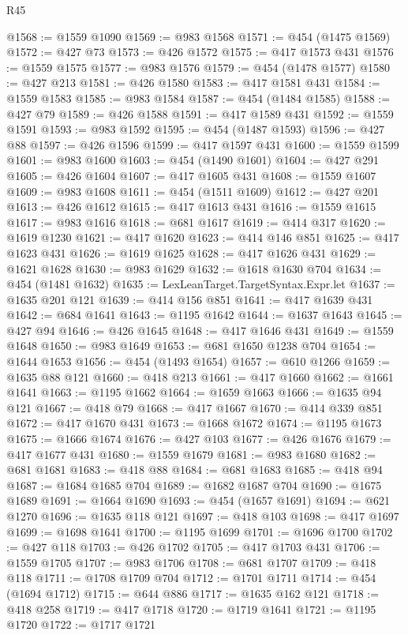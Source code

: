 \begin{lexlean}{R45}
\begin{coremodule}
{{{{{{{{{{{{{{{{{{{{{{{{{{{{{{{{{{{{{{{{{{{{{{{{{{{{{{{{{{{{{{{{{{{{{{{{{{{{{{{{{{{{{{{{{{{@1568 := @1559 @1090
@1569 := @983 @1568
@1571 := @454 (@1475 @1569)
@1572 := @427 @73
@1573 := @426 @1572
@1575 := @417 @1573 @431
@1576 := @1559 @1575
@1577 := @983 @1576
@1579 := @454 (@1478 @1577)
@1580 := @427 @213
@1581 := @426 @1580
@1583 := @417 @1581 @431
@1584 := @1559 @1583
@1585 := @983 @1584
@1587 := @454 (@1484 @1585)
@1588 := @427 @79
@1589 := @426 @1588
@1591 := @417 @1589 @431
@1592 := @1559 @1591
@1593 := @983 @1592
@1595 := @454 (@1487 @1593)
@1596 := @427 @88
@1597 := @426 @1596
@1599 := @417 @1597 @431
@1600 := @1559 @1599
@1601 := @983 @1600
@1603 := @454 (@1490 @1601)
@1604 := @427 @291
@1605 := @426 @1604
@1607 := @417 @1605 @431
@1608 := @1559 @1607
@1609 := @983 @1608
@1611 := @454 (@1511 @1609)
@1612 := @427 @201
@1613 := @426 @1612
@1615 := @417 @1613 @431
@1616 := @1559 @1615
@1617 := @983 @1616
@1618 := @681 @1617
@1619 := @414 @317
@1620 := @1619 @1230
@1621 := @417 @1620
@1623 := @414 @146 @851
@1625 := @417 @1623 @431
@1626 := @1619 @1625
@1628 := @417 @1626 @431
@1629 := @1621 @1628
@1630 := @983 @1629
@1632 := @1618 @1630 @704
@1634 := @454 (@1481 @1632)
@1635 := LexLeanTarget.TargetSyntax.Expr.let
@1637 := @1635 @201 @121
@1639 := @414 @156 @851
@1641 := @417 @1639 @431
@1642 := @684 @1641
@1643 := @1195 @1642
@1644 := @1637 @1643
@1645 := @427 @94
@1646 := @426 @1645
@1648 := @417 @1646 @431
@1649 := @1559 @1648
@1650 := @983 @1649
@1653 := @681 @1650 @1238 @704
@1654 := @1644 @1653
@1656 := @454 (@1493 @1654)
@1657 := @610 @1266
@1659 := @1635 @88 @121
@1660 := @418 @213
@1661 := @417 @1660
@1662 := @1661 @1641
@1663 := @1195 @1662
@1664 := @1659 @1663
@1666 := @1635 @94 @121
@1667 := @418 @79
@1668 := @417 @1667
@1670 := @414 @339 @851
@1672 := @417 @1670 @431
@1673 := @1668 @1672
@1674 := @1195 @1673
@1675 := @1666 @1674
@1676 := @427 @103
@1677 := @426 @1676
@1679 := @417 @1677 @431
@1680 := @1559 @1679
@1681 := @983 @1680
@1682 := @681 @1681
@1683 := @418 @88
@1684 := @681 @1683
@1685 := @418 @94
@1687 := @1684 @1685 @704
@1689 := @1682 @1687 @704
@1690 := @1675 @1689
@1691 := @1664 @1690
@1693 := @454 (@1657 @1691)
@1694 := @621 @1270
@1696 := @1635 @118 @121
@1697 := @418 @103
@1698 := @417 @1697
@1699 := @1698 @1641
@1700 := @1195 @1699
@1701 := @1696 @1700
@1702 := @427 @118
@1703 := @426 @1702
@1705 := @417 @1703 @431
@1706 := @1559 @1705
@1707 := @983 @1706
@1708 := @681 @1707
@1709 := @418 @118
@1711 := @1708 @1709 @704
@1712 := @1701 @1711
@1714 := @454 (@1694 @1712)
@1715 := @644 @886
@1717 := @1635 @162 @121
@1718 := @418 @258
@1719 := @417 @1718
@1720 := @1719 @1641
@1721 := @1195 @1720
@1722 := @1717 @1721
}}}}}}}}}}}}}}}}}}}}}}}}}}}}}}}}}}}}}}}}}}}}}}}}}}}}}}}}}}}}}}}}}}}}}}}}}}}}}}}}}}}}}}}}}}}
\end{coremodule}
\end{lexlean}
